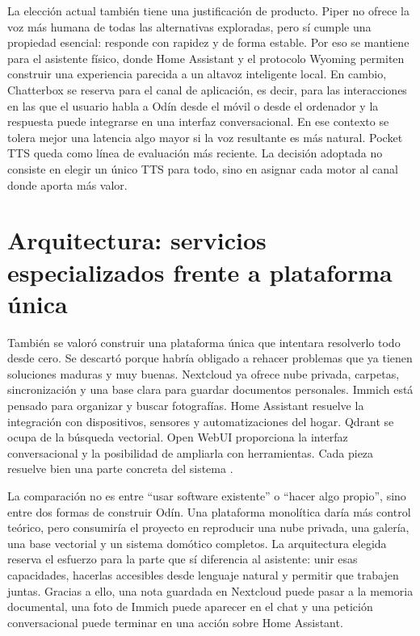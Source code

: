 La elección actual también tiene una justificación de producto. Piper no ofrece la voz más humana de todas las alternativas exploradas, pero sí cumple una propiedad esencial: responde con rapidez y de forma estable. Por eso se mantiene para el asistente físico, donde Home Assistant y el protocolo Wyoming permiten construir una experiencia parecida a un altavoz inteligente local. En cambio, Chatterbox se reserva para el canal de aplicación, es decir, para las interacciones en las que el usuario habla a Odín desde el móvil o desde el ordenador y la respuesta puede integrarse en una interfaz conversacional. En ese contexto se tolera mejor una latencia algo mayor si la voz resultante es más natural. Pocket TTS queda como línea de evaluación más reciente. La decisión adoptada no consiste en elegir un único TTS para todo, sino en asignar cada motor al canal donde aporta más valor.

\section{Arquitectura: servicios especializados frente a plataforma única}
También se valoró construir una plataforma única que intentara resolverlo todo desde cero. Se descartó porque habría obligado a rehacer problemas que ya tienen soluciones maduras y muy buenas. Nextcloud ya ofrece nube privada, carpetas, sincronización y una base clara para guardar documentos personales. Immich está pensado para organizar y buscar fotografías. Home Assistant resuelve la integración con dispositivos, sensores y automatizaciones del hogar. Qdrant se ocupa de la búsqueda vectorial. Open WebUI proporciona la interfaz conversacional y la posibilidad de ampliarla con herramientas. Cada pieza resuelve bien una parte concreta del sistema \citep{nextcloudDocs,immichDocs,homeAssistantDocs,qdrantDocs,openwebuiDocs}.

La comparación no es entre ``usar software existente'' o ``hacer algo propio'', sino entre dos formas de construir Odín. Una plataforma monolítica daría más control teórico, pero consumiría el proyecto en reproducir una nube privada, una galería, una base vectorial y un sistema domótico completos. La arquitectura elegida reserva el esfuerzo para la parte que sí diferencia al asistente: unir esas capacidades, hacerlas accesibles desde lenguaje natural y permitir que trabajen juntas. Gracias a ello, una nota guardada en Nextcloud puede pasar a la memoria documental, una foto de Immich puede aparecer en el chat y una petición conversacional puede terminar en una acción sobre Home Assistant.

